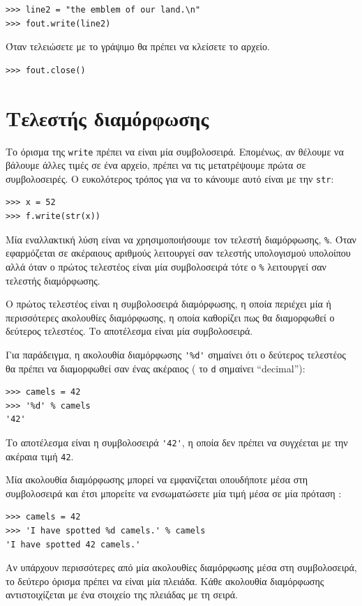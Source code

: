\documentclass[10pt]{book}
\begin{document}
\begin{verbatim}
>>> line2 = "the emblem of our land.\n"
>>> fout.write(line2)
\end{verbatim}
%
 Όταν τελειώσετε με το γράψιμο θα πρέπει να κλείσετε το αρχείο.  

\begin{verbatim}
>>> fout.close()
\end{verbatim}
%


 
\section{Τελεστής διαμόρφωσης}

Το όρισμα της  {\tt write}  πρέπει να είναι μία συμβολοσειρά. Επομένως, αν θέλουμε να βάλουμε άλλες 
τιμές σε ένα αρχείο, πρέπει να τις μετατρέψουμε πρώτα σε συμβολοσειρές. Ο ευκολότερος τρόπος για να το κάνουμε αυτό είναι 
με την  {\tt str}: 

\begin{verbatim}
>>> x = 52
>>> f.write(str(x))
\end{verbatim}
%
 Μία εναλλακτική λύση είναι να χρησιμοποιήσουμε τον τελεστή διαμόρφωσης,  {\tt \%}.  Όταν εφαρμόζεται σε ακέραιους αριθμούς 
λειτουργεί σαν τελεστής υπολογισμού υπολοίπου αλλά όταν ο πρώτος τελεστέος είναι μία συμβολοσειρά τότε ο  {\tt \%}  λειτουργεί σαν τελεστής διαμόρφωσης.

Ο πρώτος τελεστέος είναι η συμβολοσειρά διαμόρφωσης, η οποία περιέχει μία ή περισσότερες ακολουθίες διαμόρφωσης, η οποία καθορίζει πως θα διαμορφωθεί ο δεύτερος τελεστέος. Το αποτέλεσμα είναι μία συμβολοσειρά.

Για παράδειγμα, η ακολουθία διαμόρφωσης  \verb"'%d'"  σημαίνει ότι ο δεύτερος τελεστέος θα πρέπει να διαμορφωθεί σαν ένας 
ακέραιος  ( το  {\tt d}  σημαίνει  ``decimal''):

\begin{verbatim}
>>> camels = 42
>>> '%d' % camels
'42'
\end{verbatim}
%
 Το αποτέλεσμα είναι η συμβολοσειρά  \verb"'42'",  η οποία δεν πρέπει να συγχέεται με την ακέραια τιμή  {\tt 42}.

 Μία ακολουθία διαμόρφωσης μπορεί να εμφανίζεται οπουδήποτε μέσα στη συμβολοσειρά και έτσι μπορείτε να ενσωματώσετε μία τιμή 
μέσα σε μία πρόταση :

\begin{verbatim}
>>> camels = 42
>>> 'I have spotted %d camels.' % camels
'I have spotted 42 camels.'
\end{verbatim}
%
 Αν υπάρχουν περισσότερες από μία ακολουθίες διαμόρφωσης μέσα στη συμβολοσειρά, το δεύτερο όρισμα πρέπει να είναι μία πλειάδα. 
Κάθε ακολουθία διαμόρφωσης αντιστοιχίζεται με ένα στοιχείο της πλειάδας με τη σειρά.
\end{document}
